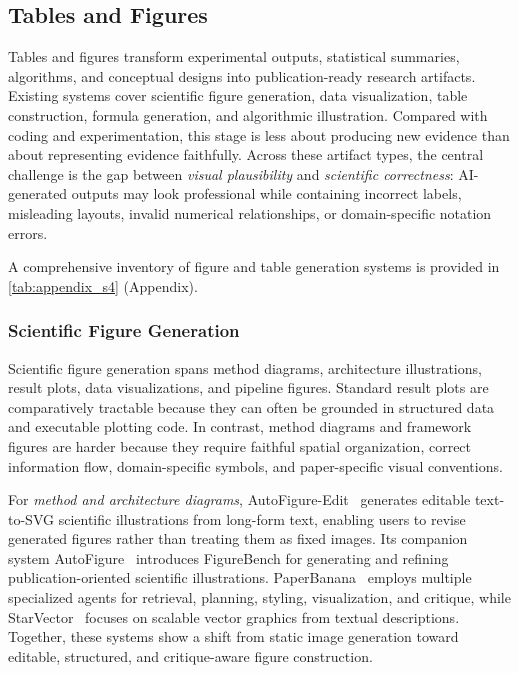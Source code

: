 \documentclass{llmxive}
\begin{document}
\subsection{Tables and Figures}
\label{sec:figure_table}

Tables and figures transform experimental outputs, statistical summaries, algorithms, and conceptual designs into publication-ready research artifacts. Existing systems cover scientific figure generation, data visualization, table construction, formula generation, and algorithmic illustration. Compared with coding and experimentation, this stage is less about producing new evidence than about representing evidence faithfully. Across these artifact types, the central challenge is the gap between \emph{visual plausibility} and \emph{scientific correctness}: AI-generated outputs may look professional while containing incorrect labels, misleading layouts, invalid numerical relationships, or domain-specific notation errors. 

A comprehensive inventory of figure and table generation systems is provided in \cref{tab:appendix_s4} (Appendix).



\subsubsection{Scientific Figure Generation}
\label{sec:figure_gen}

Scientific figure generation spans method diagrams, architecture illustrations, result plots, data visualizations, and pipeline figures. Standard result plots are comparatively tractable because they can often be grounded in structured data and executable plotting code. In contrast, method diagrams and framework figures are harder because they require faithful spatial organization, correct information flow, domain-specific symbols, and paper-specific visual conventions.

For \emph{method and architecture diagrams}, AutoFigure-Edit~\cite{autofigure2026} generates editable text-to-SVG scientific illustrations from long-form text, enabling users to revise generated figures rather than treating them as fixed images. Its companion system AutoFigure~\cite{autofigure2026iclr} introduces FigureBench for generating and refining publication-oriented scientific illustrations. PaperBanana~\cite{paperbanana2026} employs multiple specialized agents for retrieval, planning, styling, visualization, and critique, while StarVector~\cite{starVector2025} focuses on scalable vector graphics from textual descriptions. Together, these systems show a shift from static image generation toward editable, structured, and critique-aware figure construction.
\end{document}
